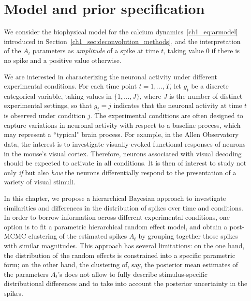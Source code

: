 \section{Model and prior specification}
\label{s:model}

We consider the biophysical model for the calcium dynamics~\eqref{ch1_eq:armodel} introduced in Section~\ref{ch1_sec:deconvolution_methods}, and the interpretation of the $A_t$ parameters as \textit{amplitude} of a spike at time $t$, taking value $0$ if there is no spike and a positive value otherwise.

We are interested in characterizing the neuronal activity under different experimental conditions. For each time point $t=1,\dots,T$, let $g_t$ be a discrete categorical variable, taking values in $\{1,\dots, J\}$, where $J$ is the number of distinct experimental settings, so that $g_t=j$ indicates that the neuronal activity at time $t$ is observed under condition $j$. The experimental conditions are often designed to capture variations in neuronal activity with respect to a baseline process, which may represent a ``typical" brain process. For example, in the Allen Observatory data, the interest is to investigate visually-evoked functional responses of neurons in the mouse's visual cortex. Therefore, neurons associated with visual decoding should be expected to activate in all conditions. It is then of interest to study not only \textit{if} but also \textit{how} the neurons differentially respond to the presentation of a variety of visual stimuli. 

In this chapter, we propose a hierarchical Bayesian approach to investigate similarities and differences in the distribution of spikes over time and conditions. In order to borrow information across different experimental conditions, one option is to fit a parametric hierarchical random effect model, and obtain a post-MCMC clustering of the estimated spikes $A_t$ by grouping together those spikes with similar magnitudes. This approach has several limitations: on the one hand, the distribution of the random effects is constrained into a specific parametric form; on the other hand, the clustering of, say, the posterior mean estimates of the parameters $A_t$'s does not allow to fully describe stimulus-specific distributional differences and to take into account the posterior uncertainty in the spikes.

